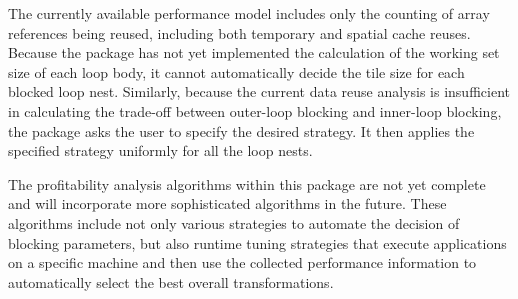The currently available performance model includes only the counting of
array references being reused, including both temporary and spatial cache reuses.
Because the package has not yet implemented the calculation of the working set size of 
each loop body, 
it cannot automatically decide the tile size for each blocked loop nest. Similarly,
because the current data reuse analysis is insufficient in calculating the trade-off between
outer-loop blocking and inner-loop blocking, the package asks the user to specify the desired
strategy. It then applies the specified strategy uniformly for all the loop nests. 

The profitability analysis algorithms within this package are not yet complete 
and will incorporate more sophisticated algorithms in the future.
These algorithms include not only various strategies to automate the decision of
blocking parameters, but also runtime tuning strategies that execute applications 
on a specific machine and then use the collected performance information to automatically 
select the best overall transformations.


